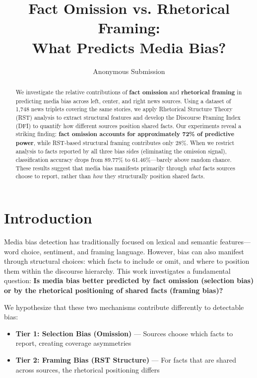 \documentclass[11pt]{article}
\title{Fact Omission vs. Rhetorical Framing: \\
What Predicts Media Bias?}
\author{Anonymous Submission}
\begin{document}
\maketitle

\begin{abstract}
We investigate the relative contributions of \textbf{fact omission} and \textbf{rhetorical framing} in predicting media bias across left, center, and right news sources. Using a dataset of 1,748 news triplets covering the same stories, we apply Rhetorical Structure Theory (RST) analysis to extract structural features and develop the Discourse Framing Index (DFI) to quantify how different sources position shared facts. Our experiments reveal a striking finding: \textbf{fact omission accounts for approximately 72\% of predictive power}, while RST-based structural framing contributes only 28\%. When we restrict analysis to facts reported by all three bias sides (eliminating the omission signal), classification accuracy drops from 89.77\% to 61.46\%---barely above random chance. These results suggest that media bias manifests primarily through \textit{what} facts sources choose to report, rather than \textit{how} they structurally position shared facts.
\end{abstract}

\section{Introduction}

Media bias detection has traditionally focused on lexical and semantic features---word choice, sentiment, and framing language. However, bias can also manifest through structural choices: which facts to include or omit, and where to position them within the discourse hierarchy. This work investigates a fundamental question: \textbf{Is media bias better predicted by fact omission (selection bias) or by the rhetorical positioning of shared facts (framing bias)?}

We hypothesize that these two mechanisms contribute differently to detectable bias:
\begin{itemize}
    \item \textbf{Tier 1: Selection Bias (Omission)} --- Sources choose which facts to report, creating coverage asymmetries
    \item \textbf{Tier 2: Framing Bias (RST Structure)} --- For facts that are shared across sources, the rhetorical positioning differs
\end{itemize}
\end{document}
